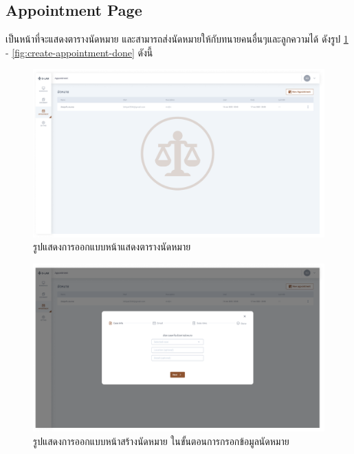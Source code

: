 \documentclass[12pt,oneside,openright,a4paper]{cpe-thai-project}
\begin{document}
\subsection{Appointment Page}
\hspace*{1cm} เป็นหน้าที่จะแสดงตารางนัดหมาย และสามารถส่งนัดหมายให้กับทนายคนอื่นๆและลูกความได้ ดังรูป \ref{fig:appointment} - \ref{fig:create-appointment-done} ดังนี้
\begin{figure}[!h]\centering
  \includegraphics[width=13cm]{./assets/userinterface/appointment.png}
  \caption{รูปแสดงการออกแบบหน้าแสดงตารางนัดหมาย}\label{fig:appointment}
\end{figure}

\clearpage

\begin{figure}[!h]\centering
  \includegraphics[width=13cm]{./assets/userinterface/create-appointment-info.png}
  \caption{รูปแสดงการออกแบบหน้าสร้างนัดหมาย ในขั้นตอนการกรอกข้อมูลนัดหมาย}\label{fig:create-appointment-info}
\end{figure}
\end{document}
